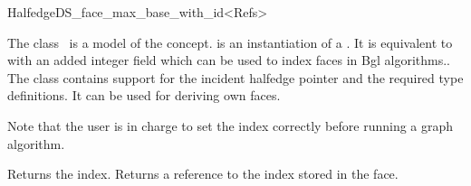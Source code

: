 



\begin{ccRefClass}{HalfedgeDS_face_max_base_with_id<Refs>}
  
\ccDefinition

The class \ccRefName\ is a model of the 
concept.  is an instantiation of a .  It is
equivalent to 
with an added integer field which can be used to index faces
in {\sc Bgl} algorithms.. 
The class contains support for the incident halfedge pointer
and the required type definitions.
It can be used for deriving own faces.

Note that the user is in charge to set the index correctly before
running a graph algorithm.



\ccIsModel


\ccCreation
{}


{Returns the index.}
\ccGlue
{}
{Returns a reference to the index stored in the face.}

\ccSeeAlso

\\
\\
\\
\\
\\
\\
\\
\\
\\
\\

\end{ccRefClass}


